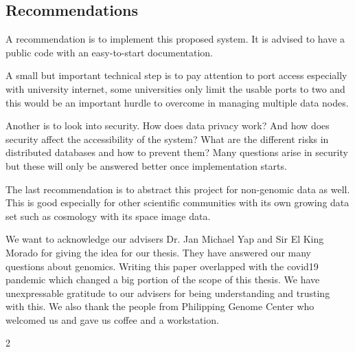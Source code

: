\documentclass[acmsmall]{acmart}
\begin{document}
\begin{multicols}{2}
\section{Recommendations}
A recommendation is to implement this proposed system. It is advised to have a public code with an easy-to-start documentation.

A small but important technical step is to pay attention to port access especially with university internet, some universities only limit the usable ports to two and this would be an important hurdle to overcome in managing multiple data nodes.

Another is to look into security. How does data privacy work? And how does security affect the accessibility of the system? What are the different risks in distributed databases and how to prevent them? Many questions arise in security but these will only be answered better once implementation starts.

The last recommendation is to abstract this project for non-genomic data as well. This is good especially for other scientific communities with its own growing data set such as cosmology with its space image data. 

\begin{acks}

We want to acknowledge our advisers Dr. Jan Michael Yap and Sir El King Morado for giving the idea for our thesis. They have answered our many questions about genomics. Writing this paper overlapped with the covid19 pandemic which changed a big portion of the scope of this thesis. We have unexpressable gratitude to our advisers for being understanding and trusting with this. We also thank the people from Philipping Genome Center who welcomed us and gave us coffee and a workstation.
\end{acks}

%





\end{multicols}{2}
\end{document}
